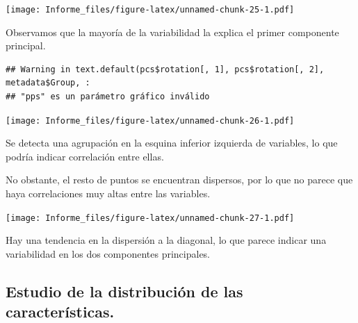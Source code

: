 \documentclass[
]{article}
\newenvironment{Shaded}{\begin{snugshade}}{\end{snugshade}}
\newcommand{\AttributeTok}[1]{\textcolor[rgb]{0.13,0.29,0.53}{#1}}
\newcommand{\DecValTok}[1]{\textcolor[rgb]{0.00,0.00,0.81}{#1}}
\newcommand{\FloatTok}[1]{\textcolor[rgb]{0.00,0.00,0.81}{#1}}
\newcommand{\FunctionTok}[1]{\textcolor[rgb]{0.13,0.29,0.53}{\textbf{#1}}}
\newcommand{\NormalTok}[1]{#1}
\newcommand{\SpecialCharTok}[1]{\textcolor[rgb]{0.81,0.36,0.00}{\textbf{#1}}}
\newcommand{\StringTok}[1]{\textcolor[rgb]{0.31,0.60,0.02}{#1}}
\begin{document}
\texttt{[image: Informe\_files/figure-latex/unnamed-chunk-25-1.pdf]}

Observamos que la mayoría de la variabilidad la explica el primer
componente principal.

\begin{Shaded}
\end{Shaded}

\begin{verbatim}
## Warning in text.default(pcs$rotation[, 1], pcs$rotation[, 2], metadata$Group, :
## "pps" es un parámetro gráfico inválido
\end{verbatim}

\texttt{[image: Informe\_files/figure-latex/unnamed-chunk-26-1.pdf]}

Se detecta una agrupación en la esquina inferior izquierda de variables,
lo que podría indicar correlación entre ellas.

No obstante, el resto de puntos se encuentran dispersos, por lo que no
parece que haya correlaciones muy altas entre las variables.

\begin{Shaded}
\end{Shaded}

\texttt{[image: Informe\_files/figure-latex/unnamed-chunk-27-1.pdf]}

Hay una tendencia en la dispersión a la diagonal, lo que parece indicar
una variabilidad en los dos componentes principales.

\subsection{Estudio de la distribución de las
características.}\label{estudio-de-la-distribuciuxf3n-de-las-caracteruxedsticas.}
\end{document}

